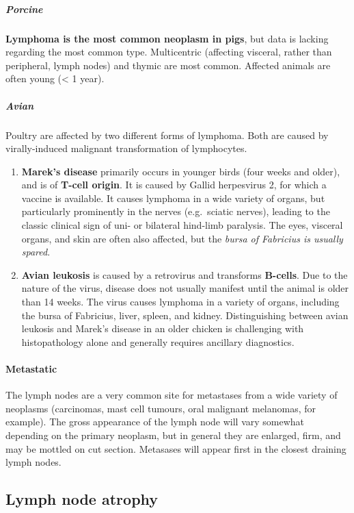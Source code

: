 \documentclass[openany]{article}
\providecommand{\tightlist}{%
  \setlength{\itemsep}{0pt}\setlength{\parskip}{0pt}}
\let\oldparagraph\paragraph
\renewcommand{\paragraph}[1]{\oldparagraph{#1}\mbox{}}
\let\oldsubparagraph\subparagraph
\renewcommand{\subparagraph}[1]{\oldsubparagraph{#1}\mbox{}}
\begin{document}
\subparagraph{Porcine}\label{porcine}

\textbf{Lymphoma is the most common neoplasm in pigs}, but data is
lacking regarding the most common type. Multicentric (affecting
visceral, rather than peripheral, lymph nodes) and thymic are most
common. Affected animals are often young (\textless{} 1 year).

\subparagraph{Avian}\label{avian}

Poultry are affected by two different forms of lymphoma. Both are caused
by virally-induced malignant transformation of lymphocytes.

\begin{enumerate}
\def\labelenumi{\arabic{enumi}.}
\tightlist
\item
  \textbf{Marek's disease} primarily occurs in younger birds (four weeks
  and older), and is of \textbf{T-cell origin}. It is caused by Gallid
  herpesvirus 2, for which a vaccine is available. It causes lymphoma in
  a wide variety of organs, but particularly prominently in the nerves
  (e.g.~sciatic nerves), leading to the classic clinical sign of uni- or
  bilateral hind-limb paralysis. The eyes, visceral organs, and skin are
  often also affected, but the \emph{bursa of Fabricius is usually
  spared}.
\item
  \textbf{Avian leukosis} is caused by a retrovirus and transforms
  \textbf{B-cells}. Due to the nature of the virus, disease does not
  usually manifest until the animal is older than 14 weeks. The virus
  causes lymphoma in a variety of organs, including the bursa of
  Fabricius, liver, spleen, and kidney. Distinguishing between avian
  leukosis and Marek's disease in an older chicken is challenging with
  histopathology alone and generally requires ancillary diagnostics.
\end{enumerate}

\paragraph{Metastatic}\label{metastatic}

The lymph nodes are a very common site for metastases from a wide
variety of neoplasms (carcinomas, mast cell tumours, oral malignant
melanomas, for example). The gross appearance of the lymph node will
vary somewhat depending on the primary neoplasm, but in general they are
enlarged, firm, and may be mottled on cut section. Metasases will appear
first in the closest draining lymph nodes.

\subsection{Lymph node atrophy}\label{lymph-node-atrophy}
\end{document}
